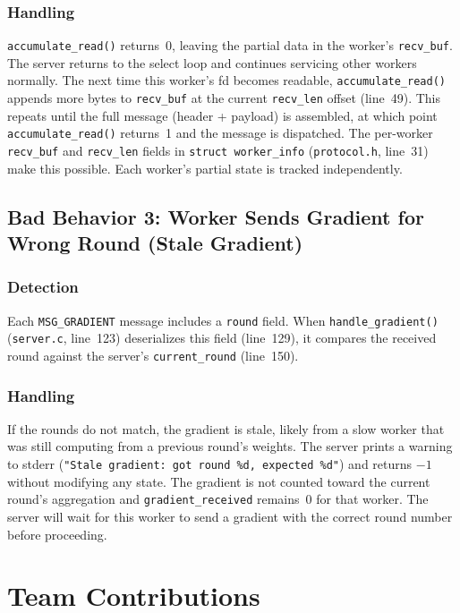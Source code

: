 \documentclass[11pt]{article}
\begin{document}
\subsubsection*{Handling}
\texttt{accumulate\_read()} returns~0, leaving the partial data in the worker's
\texttt{recv\_buf}. The server returns to the select loop and continues
servicing other workers normally. The next time this worker's fd becomes
readable, \texttt{accumulate\_read()} appends more bytes to \texttt{recv\_buf}
at the current \texttt{recv\_len} offset (line~49). This repeats until the full
message (header + payload) is assembled, at which point
\texttt{accumulate\_read()} returns~1 and the message is dispatched. The
per-worker \texttt{recv\_buf} and \texttt{recv\_len} fields in
\texttt{struct worker\_info} (\texttt{protocol.h}, line~31) make this
possible. Each worker's partial state is tracked independently.

\subsection{Bad Behavior 3: Worker Sends Gradient for Wrong Round (Stale Gradient)}

\subsubsection*{Detection}
Each \texttt{MSG\_GRADIENT} message includes a \texttt{round} field. When
\texttt{handle\_gradient()} (\texttt{server.c}, line~123) deserializes this
field (line~129), it compares the received round against the server's
\texttt{current\_round} (line~150).

\subsubsection*{Handling}
If the rounds do not match, the gradient is stale, likely from a slow worker
that was still computing from a previous round's weights. The server prints a
warning to stderr (\texttt{"Stale gradient: got round \%d, expected \%d"}) and
returns $-1$ without modifying any state. The gradient is not counted toward the
current round's aggregation and \texttt{gradient\_received} remains~0 for that
worker. The server will wait for this worker to send a gradient with the correct
round number before proceeding.

\section{Team Contributions}
\end{document}
